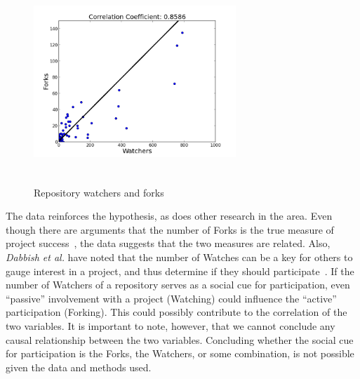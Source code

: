 \documentclass{proc}
\begin{document}
{{{{{{\begin{figure}
\includegraphics[height=3in,width=3in]{images/watcher_forks_scatterplot.png}
\caption{Repository watchers and forks}
\end{figure}

The data reinforces the hypothesis, as does other research in the area. Even though there are arguments that the number of Forks is the true measure of project success~\cite{baudry2012towards}, the data suggests that the two measures are related. Also, \textit{Dabbish et al.} have noted that the number of Watches can be a key for others to gauge interest in a project, and thus determine if they should participate~\cite{dabbish2013leveraging}. If the number of Watchers of a repository serves as a social cue for participation, even ``passive'' involvement with a project (Watching) could influence the ``active'' participation (Forking). This could possibly contribute to the correlation of the two variables. It is important to note, however, that we cannot conclude any causal relationship between the two variables. Concluding whether the social cue for participation is the Forks, the Watchers, or some combination, is not possible given the data and methods used.\\

}}}}}}
\end{document}
